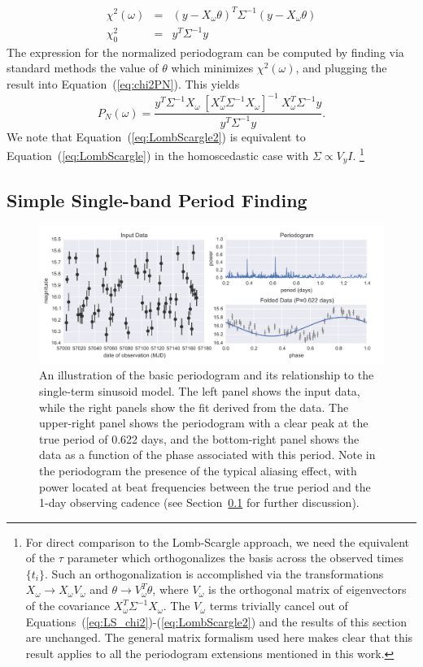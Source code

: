 \documentclass{emulateapj}
\newcommand{\figlabel}[1]{\label{fig:#1}}
\newcommand{\Eq}[1]{Equation~(\ref{eq:#1})}
\newcommand{\eq}[1]{\Eq{#1}}
\newcommand{\eqs}[2]{Equations~(\ref{eq:#1})-(\ref{eq:#2})}
\newcommand{\eqlabel}[1]{\label{eq:#1}}
\newcommand{\Sect}[1]{Section~\ref{sect:#1}}
\newcommand{\sect}[1]{\Sect{#1}}
\newcommand{\sectlabel}[1]{\label{sect:#1}}
\newcommand{\new}[1]{{\color{red} #1}}
\begin{document}
\begin{eqnarray}
  \eqlabel{LS_chi2}
  \chi^2(\omega) &=& (y - X_\omega\theta)^T\Sigma^{-1}(y - X_\omega\theta)\\
  \chi^2_0 &=& y^T \Sigma^{-1} y
\end{eqnarray}
The expression for the normalized periodogram can be computed by finding via standard methods the value of $\theta$ which minimizes $\chi^2(\omega)$, and plugging the result into \eq{chi2PN}. This yields
\begin{equation}
  \eqlabel{LombScargle2}
  P_N(\omega) = \frac{y^T\Sigma^{-1}X_\omega~[X_\omega^T\Sigma^{-1}X_\omega]^{-1}~X_\omega^T\Sigma^{-1}y}{y^T\Sigma^{-1}y}.
\end{equation}
We note that \eq{LombScargle2} is equivalent to \eq{LombScargle} in the homoscedastic case with $\Sigma \propto V_y I$.
\footnote{\new{For direct comparison to the Lomb-Scargle approach, we need the equivalent of the $\tau$ parameter which orthogonalizes the basis across the observed times $\{t_i\}$.
Such an orthogonalization is accomplished via the transformations $X_\omega \to X_\omega V_\omega$ and $\theta \to V_\omega^T \theta$, where $V_\omega$ is the orthogonal matrix of eigenvectors of the covariance $X_\omega^T \Sigma^{-1} X_\omega$.
The $V_\omega$ terms trivially cancel out of \eqs{LS_chi2}{LombScargle2} and the results of this section are unchanged.
The general matrix formalism used here makes clear that this result applies to all the periodogram extensions mentioned in this work.}\label{footnote:ortho2}}


\subsection{Simple Single-band Period Finding}
\sectlabel{simple_period}

\begin{figure}
  \centering
  \includegraphics[width=\textwidth]{fig01.pdf}
  \caption{
    An illustration of the basic periodogram and its relationship to the single-term sinusoid model. The left panel shows the input data, while the right panels show the fit derived from the data. The upper-right panel shows the periodogram with a clear peak at the true period of 0.622 days, and the bottom-right panel shows the data as a function of the phase associated with this period. Note in the periodogram the presence of the typical aliasing effect, with power located at beat frequencies between the true period and the 1-day observing cadence (see \sect{simple_period} for further discussion).
  }
  \figlabel{basic_example}
\end{figure}
\end{document}
